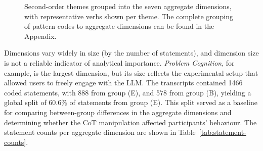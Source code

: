 \begin{figure}[ht]
{%
    }
    \caption[Second-order themes grouped into aggregate dimensions]{Second-order themes grouped into the seven aggregate dimensions, with representative verbs shown per theme. The complete grouping of pattern codes to aggregate dimensions can be found in the Appendix.}
    \label{fig:theme-dimension-mapping}
\end{figure}

Dimensions vary widely in size (by the number of statements), and dimension size is not a reliable indicator of analytical importance. \textit{Problem Cognition}, for example, is the largest dimension, but its size reflects the experimental setup that allowed users to freely engage with the \ac{LLM}. The transcripts contained 1466 coded statements, with 888 from group (E), and 578 from group (B), yielding a global split of 60.6\% of statements from group (E). This split served as a baseline for comparing between-group differences in the aggregate dimensions and determining whether the \ac{CoT} manipulation affected participants' behaviour. The statement counts per aggregate dimension are shown in Table~\ref{tab:statement-counts}.

